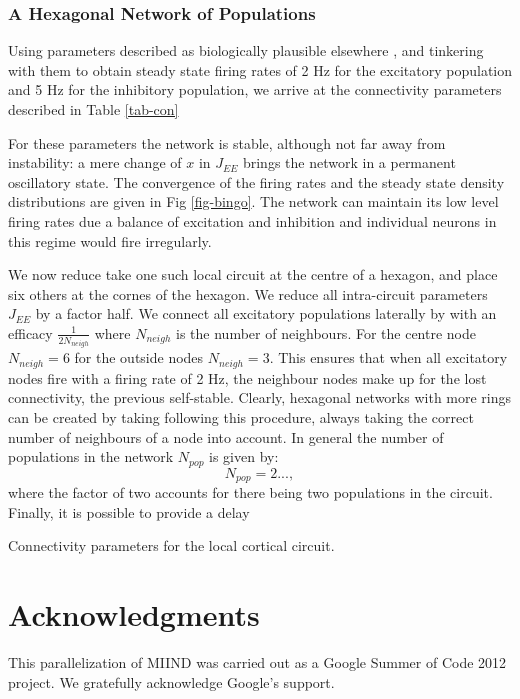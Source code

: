 \documentclass[12pt]{article}
\begin{document}
\subsubsection{A Hexagonal Network of Populations}
\label{sec-hexagon}
Using parameters described as biologically plausible elsewhere \citet{amit1997}, and tinkering with them to obtain
steady state firing rates of 2 Hz for the excitatory population and 5 Hz for the inhibitory population, we arrive at the
connectivity parameters described in Table \ref{tab-con}
\begin{table}[h]
\label{tab-con}
For these parameters the network is stable, although not far away from instability: a mere change of $x$ in $J_{EE}$ brings the network
in a permanent oscillatory state. The convergence of the firing rates and the steady state density distributions are given in Fig \ref{fig-bingo}.
The network can maintain its low level firing rates due a balance of excitation and inhibition and individual neurons in this regime
would fire irregularly.


We now reduce take one such local circuit at the centre of a hexagon, and place six others at the cornes of the hexagon. We
reduce all intra-circuit parameters $J_{EE}$ by a factor half. We connect all excitatory populations laterally by with an efficacy
$\frac{1}{2N_{neigh}}$ where $N_{neigh}$ is the number of neighbours. For the centre node $N_{neigh}= 6$ for the outside nodes $N_{neigh} = 3$.
This ensures that when all excitatory nodes fire with a firing rate of 2 Hz, the neighbour nodes make up for the lost connectivity,
the previous self-stable. Clearly, hexagonal networks with more rings can be created by taking following this procedure, always taking
the correct number of neighbours of a node into account. In general the number of populations in the network $N_{pop}$ is given
by:
\begin{equation}
N_{pop} = 2 ...,
\end{equation}
where the factor of two accounts for there being two populations in the circuit. Finally, it is possible to provide a delay
\caption{Connectivity parameters for the local cortical circuit.}
\end{table}
\section*{Acknowledgments}
This parallelization of MIIND was carried out as a Google Summer of Code 2012 project. We gratefully acknowledge Google's support. 
\end{document}
